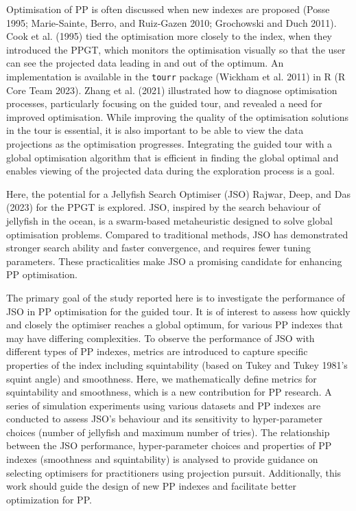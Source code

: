 \documentclass[
  12pt,
]{interact}
\theoremstyle{plain}
\begin{document}
Optimisation of PP is often discussed when new indexes are proposed
(Posse 1995; Marie-Sainte, Berro, and Ruiz-Gazen 2010; Grochowski and
Duch 2011). Cook et al. (1995) tied the optimisation more closely to the
index, when they introduced the PPGT, which monitors the optimisation
visually so that the user can see the projected data leading in and out
of the optimum. An implementation is available in the \texttt{tourr}
package (Wickham et al. 2011) in R (R Core Team 2023). Zhang et al.
(2021) illustrated how to diagnose optimisation processes, particularly
focusing on the guided tour, and revealed a need for improved
optimisation. While improving the quality of the optimisation solutions
in the tour is essential, it is also important to be able to view the
data projections as the optimisation progresses. Integrating the guided
tour with a global optimisation algorithm that is efficient in finding
the global optimal and enables viewing of the projected data during the
exploration process is a goal.

Here, the potential for a Jellyfish Search Optimiser (JSO) Rajwar, Deep,
and Das (2023) for the PPGT is explored. JSO, inspired by the search
behaviour of jellyfish in the ocean, is a swarm-based metaheuristic
designed to solve global optimisation problems. Compared to traditional
methods, JSO has demonstrated stronger search ability and faster
convergence, and requires fewer tuning parameters. These practicalities
make JSO a promising candidate for enhancing PP optimisation.

The primary goal of the study reported here is to investigate the
performance of JSO in PP optimisation for the guided tour. It is of
interest to assess how quickly and closely the optimiser reaches a
global optimum, for various PP indexes that may have differing
complexities. To observe the performance of JSO with different types of
PP indexes, metrics are introduced to capture specific properties of the
index including squintability (based on Tukey and Tukey 1981's squint
angle) and smoothness. Here, we mathematically define metrics for
squintability and smoothness, which is a new contribution for PP
research. A series of simulation experiments using various datasets and
PP indexes are conducted to assess JSO's behaviour and its sensitivity
to hyper-parameter choices (number of jellyfish and maximum number of
tries). The relationship between the JSO performance, hyper-parameter
choices and properties of PP indexes (smoothness and squintability) is
analysed to provide guidance on selecting optimisers for practitioners
using projection pursuit. Additionally, this work should guide the
design of new PP indexes and facilitate better optimization for PP.
\end{document}

